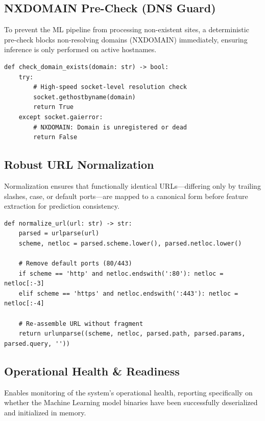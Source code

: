\subsection{NXDOMAIN Pre-Check (DNS Guard)}
\noindent
To prevent the ML pipeline from processing non-existent sites, a deterministic pre-check blocks non-resolving domains (NXDOMAIN) immediately, ensuring inference is only performed on active hostnames.

\begin{listing}[htbp]
\begin{verbatim}
def check_domain_exists(domain: str) -> bool:
    try:
        # High-speed socket-level resolution check
        socket.gethostbyname(domain)
        return True
    except socket.gaierror:
        # NXDOMAIN: Domain is unregistered or dead
        return False
\end{verbatim}
\caption{NXDOMAIN Pre-Check Domain Verification (dns\_guard.py)}
\label{lst:dns_precheck}
\end{listing}


\subsection{Robust URL Normalization}
\noindent
Normalization ensures that functionally identical URLs—differing only by trailing slashes, case, or default ports—are mapped to a canonical form before feature extraction for prediction consistency.

\begin{listing}[htbp]
\begin{verbatim}
def normalize_url(url: str) -> str:
    parsed = urlparse(url)
    scheme, netloc = parsed.scheme.lower(), parsed.netloc.lower()
    
    # Remove default ports (80/443)
    if scheme == 'http' and netloc.endswith(':80'): netloc = netloc[:-3]
    elif scheme == 'https' and netloc.endswith(':443'): netloc = netloc[:-4]
        
    # Re-assemble URL without fragment
    return urlunparse((scheme, netloc, parsed.path, parsed.params, parsed.query, ''))
\end{verbatim}
\caption{Canonical URL Normalization Pipeline (url\_normalizer.py)}
\label{lst:url_normalization}
\end{listing}

\subsection{Operational Health \& Readiness}
\noindent
Enables monitoring of the system's operational health, reporting specifically on whether the Machine Learning model binaries have been successfully deserialized and initialized in memory.

